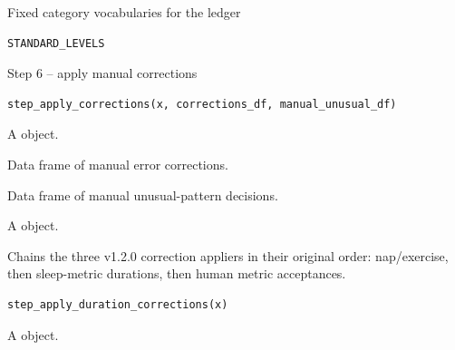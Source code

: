 \documentclass[a4paper]{book}
\begin{document}
%
\begin{Description}
Fixed category vocabularies for the ledger
\end{Description}
%
\begin{Usage}
\begin{verbatim}
STANDARD_LEVELS
\end{verbatim}
\end{Usage}
%
\begin{Description}
Step 6 -- apply manual corrections
\end{Description}
%
\begin{Usage}
\begin{verbatim}
step_apply_corrections(x, corrections_df, manual_unusual_df)
\end{verbatim}
\end{Usage}
%
\begin{Arguments}
\begin{ldescription}
\item[\code{x}] A  object.

\item[\code{corrections\_df}] Data frame of manual error corrections.

\item[\code{manual\_unusual\_df}] Data frame of manual unusual-pattern decisions.
\end{ldescription}
\end{Arguments}
%
\begin{Value}
A  object.
\end{Value}
%
\begin{Description}
Chains the three v1.2.0 correction appliers in their original order:
nap/exercise, then sleep-metric durations, then human metric acceptances.
\end{Description}
%
\begin{Usage}
\begin{verbatim}
step_apply_duration_corrections(x)
\end{verbatim}
\end{Usage}
%
\begin{Arguments}
\begin{ldescription}
\item[\code{x}] A  object.
\end{ldescription}
\end{Arguments}
\end{document}
